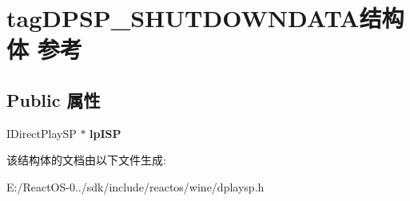 \hypertarget{structtag_d_p_s_p___s_h_u_t_d_o_w_n_d_a_t_a}{}\section{tag\+D\+P\+S\+P\+\_\+\+S\+H\+U\+T\+D\+O\+W\+N\+D\+A\+T\+A结构体 参考}
\label{structtag_d_p_s_p___s_h_u_t_d_o_w_n_d_a_t_a}
\subsection*{Public 属性}
\begin{DoxyCompactItemize}
\item 
\mbox{\label{structtag_d_p_s_p___s_h_u_t_d_o_w_n_d_a_t_a_a2d23dbc52a269d5891dca78ffa802d5b}} 
I\+Direct\+Play\+SP $\ast$ {\bfseries lp\+I\+SP}
\end{DoxyCompactItemize}


该结构体的文档由以下文件生成\+:\begin{DoxyCompactItemize}
\item 
E\+:/\+React\+O\+S-\/0../sdk/include/reactos/wine/dplaysp.\+h\end{DoxyCompactItemize}
